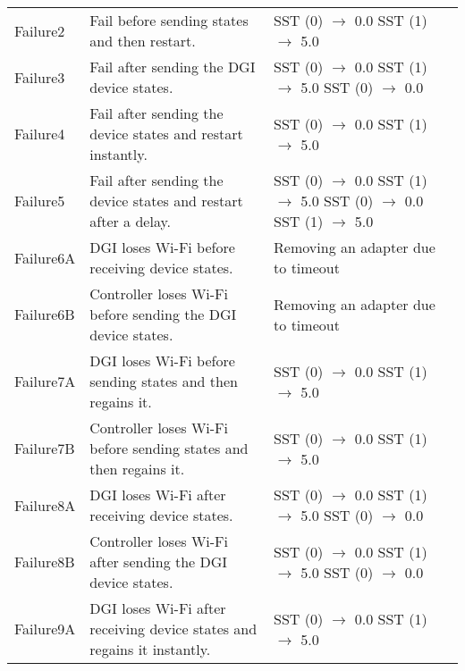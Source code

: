 \documentclass{article}
\begin{document}
\begin{center}
\begin{footnotesize}
\begin{longtable}{|p{3cm}|p{4cm}|p{10cm}|c|}
    Failure2 & Fail before sending states and then restart. & SST (0) $\rightarrow$ 0.0 \newline SST (1) $\rightarrow$ 5.0 & \\
    Failure3 & Fail after sending the DGI device states. & SST (0) $\rightarrow$ 0.0 \newline SST (1) $\rightarrow$ 5.0 \newline SST (0) $\rightarrow$ 0.0 & \\
    Failure4 & Fail after sending the device states and restart instantly. & SST (0) $\rightarrow$ 0.0 \newline SST (1) $\rightarrow$ 5.0 & \\
    Failure5 & Fail after sending the device states and restart after a delay. & SST (0) $\rightarrow$ 0.0 \newline SST (1) $\rightarrow$ 5.0 \newline SST (0) $\rightarrow$ 0.0 \newline SST (1) $\rightarrow$ 5.0 & \\
    Failure6A & DGI loses Wi-Fi before receiving device states. & Removing an adapter due to timeout & \\
    Failure6B & Controller loses Wi-Fi before sending the DGI device states. & Removing an adapter due to timeout & \\
    Failure7A & DGI loses Wi-Fi before sending states and then regains it. & SST (0) $\rightarrow$ 0.0 \newline SST (1) $\rightarrow$ 5.0 & \\
    Failure7B & Controller loses Wi-Fi before sending states and then regains it. & SST (0) $\rightarrow$ 0.0 \newline SST (1) $\rightarrow$ 5.0 & \\
    Failure8A & DGI loses Wi-Fi after receiving device states. & SST (0) $\rightarrow$ 0.0 \newline SST (1) $\rightarrow$ 5.0 \newline SST (0) $\rightarrow$ 0.0 & \\
    Failure8B & Controller loses Wi-Fi after sending the DGI device states. & SST (0) $\rightarrow$ 0.0 \newline SST (1) $\rightarrow$ 5.0 \newline SST (0) $\rightarrow$ 0.0 & \\
    Failure9A & DGI loses Wi-Fi after receiving device states and regains it instantly. & SST (0) $\rightarrow$ 0.0 \newline SST (1) $\rightarrow$ 5.0 & \\

\end{longtable}
\end{footnotesize}
\end{center}
\end{document}
